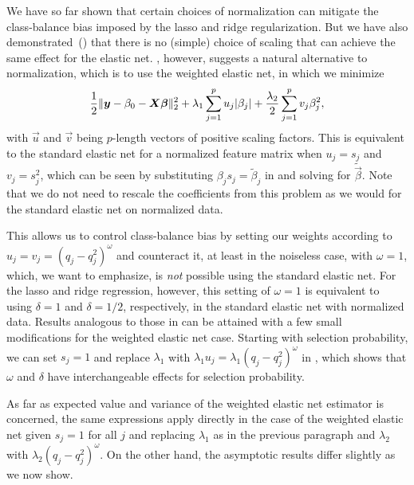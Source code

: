 We have so far shown that certain choices of normalization can mitigate the class-balance
bias imposed by the lasso and ridge regularization. But we have also
demonstrated~() that there is no (simple) choice of
scaling that can achieve the same effect for the elastic net.
, however, suggests a natural alternative to normalization,
which is to use the weighted elastic net, in which we minimize
\[
  \frac{1}{2} \lVert \bm{y} - \beta_0 - \bm{X}\bm{\beta}\rVert_2^2 + \lambda_1 \sum_{j=1}^p u_j |\beta_j| + \frac{\lambda_2}{2} \sum_{j=1}^p v_j \beta_j^2,
\]
with \(\vec{u}\) and \(\vec{v}\) being \(p\)-length vectors of positive scaling factors.
This is equivalent to the standard elastic net for a normalized feature matrix when \(u_j =
s_j\) and \(v_j = s_j^2\), which can be seen by substituting \(\beta_js_j =
\tilde{\beta}_j\) in  and solving for \(\tilde{\vec{\beta}}\). Note
that we do not need to rescale the coefficients from this problem as we would for the
standard elastic net on normalized data.

This allows us to control class-balance bias by setting our weights according to \(u_j =
v_j = (q_j - q_j^2)^{\omega}\) and counteract it, at least in the noiseless case, with
\(\omega = 1\), which, we want to emphasize, is \emph{not} possible using the standard
elastic net. For the lasso and ridge regression, however, this setting of \(\omega=1\) is
equivalent to using \(\delta = 1\) and \(\delta = 1/2\), respectively, in the standard
elastic net with normalized data. Results analogous to those in
 can be attained with a few small modifications for the
weighted elastic net case. Starting with selection probability, we can set \(s_j = 1\) and
replace \(\lambda_1\) with \(\lambda_1 u_j = \lambda_1(q_j-q_j^2)^\omega\) in
, which shows that \(\omega\) and \(\delta\) have
interchangeable effects for selection probability.

As far as expected value and variance of the weighted elastic net estimator is concerned,
the same expressions apply directly in the case of the weighted elastic net given \(s_j =
1\) for all \(j\) and replacing \(\lambda_1\) as in the previous paragraph and
\(\lambda_2\) with \(\lambda_2 (q_j - q_j^2)^\omega\). On the other hand, the asymptotic
results differ slightly as we now show.

